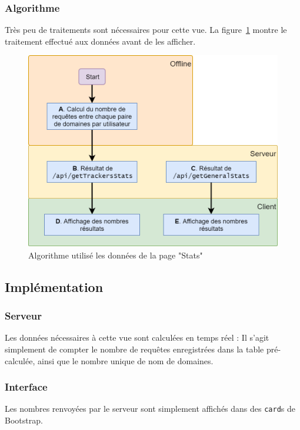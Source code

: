 		\subsubsection{Algorithme}

			Très peu de traitements sont nécessaires pour cette vue. La figure~\ref{stats_algo} montre le traitement effectué aux données avant de les afficher.

			\begin{figure}[!h]
				\centering
				\includegraphics[height=0.6\textwidth]{images/design/pages/stats_algo}
				\caption{Algorithme utilisé les données de la page "Stats"}
				\label{stats_algo}
			\end{figure}

	\subsection{Implémentation}

		\subsubsection{Serveur}

			Les données nécessaires à cette vue sont calculées en temps réel : Il s'agit simplement de compter le nombre de requêtes enregistrées dans la table pré-calculée, ainsi que le nombre unique de nom de domaines.

		\subsubsection{Interface}

			Les nombres renvoyées par le serveur sont simplement affichés dans des \texttt{card}s de Bootstrap.

\clearpage